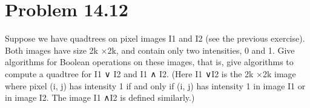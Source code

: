 \documentclass[11pt,psfig]{article}
\begin{document}
\section*{Problem 14.12}

Suppose we have quadtrees on pixel images I1 and I2 (see the previous
exercise). Both images have size 2k ×2k, and contain only two intensities,
0 and 1. Give algorithms for Boolean operations on these images,
that is, give algorithms to compute a quadtree for I1 ∨ I2 and I1 ∧ I2.
(Here I1 ∨I2 is the 2k ×2k image where pixel (i, j) has intensity 1 if and
only if (i, j) has intensity 1 in image I1 or in image I2. The image I1 ∧I2
is defined similarly.)


\end{document}
